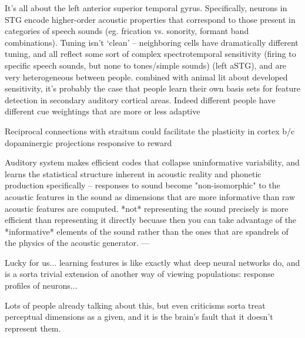 \begin{multicols}{2}
It's all about the left anterior superior temporal gyrus\cite{yiEncodingSpeechSounds2019}. Specifically, neurons in STG encode higher-order acoustic properties that correspond to those present in categories of speech sounds (eg. frication vs. sonority, formant band combinations). Tuning isn't `clean' -- neighboring cells have dramatically different tuning, and all reflect some sort of complex spectrotemporal sensitivity (firing to specific speech sounds, but none to tones/simple sounds) (left aSTG)\cite{chanSpeechSpecificTuningNeurons2014}, and are very heterogeneous between people. combined with animal lit about developed sensitivity, it's probably the case that people learn their own basis sets for feature detection in secondary auditory cortical areas. Indeed different people have different cue weightings that are more or less adaptive\cite{clayardsDifferencesCueWeights2018}



Reciprocal connections with straitum could facilitate the plasticity in cortex b/c dopaminergic projections responsive to reward \cite{fengRoleHumanAuditory2018}

Auditory system makes efficient codes that collapse uninformative variability\cite{smithEfficientAuditoryCoding2006a,stilpRapidEfficientCoding2010}, and learns the statistical structure inherent in acoustic reality \cite{schiavoCapacitiesNeuralMechanisms2019} and phonetic production specifically\cite{kuhlNewViewLanguage2000} -- responses to sound become "non-isomorphic" to the acoustic features in the sound \cite{stilpEfficientCodingStatistically2012,wangNeuralCodingStrategies2007} as dimensions that are more informative than raw acoustic features are computed. *not* representing the sound precisely is more efficient than representing it directly becuase then you can take advantage of the *informative* elements of the sound rather than the ones that are spandrels of the physics of the acoustic generator.
---

Lucky for us... learning features is like exactly what deep neural networks do, and is a sorta trivial extension of another way of viewing populations: response profiles of neurons...

Lots of people already talking about this, but even criticisms sorta treat perceptual dimensions as a given, and it is the brain's fault that it doesn't represent them. \cite{goddardInterpretingDimensionsNeural2018a}


\end{multicols}
